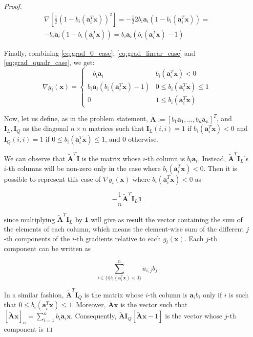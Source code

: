 \documentclass[12pt]{article}
\newcommand{\xb}{\mathbf{x}}
\newcommand{\ab}{\mathbf{a}}
\newcommand{\abi}{\ab_i}
\newcommand{\sumin}{\sum_{i = 1}^n}
\newcommand{\ax}{\abi^T\xb}
\newcommand{\atilde}{\mathbf{\tilde{A}}}
\newcommand{\id}{\mathbf{I}}
\newcommand{\ones}{\mathbf{1}}
\begin{document}
\begin{proof}
\begin{gather}
    \nabla \left [\frac{1}{2}(1 - b_i(\ax))^2\right] = \nonumber
    -\frac{1}{2} 2 b_i\abi(1 - b_i(\ax)) = \\ \label{eq:grad_quadr_case}
    -b_i\abi(1 - b_i(\ax)) = b_i\abi(b_i(\ax) - 1)
\end{gather}

Finally, combining \eqref{eq:grad_0_case}, \eqref{eq:grad_linear_case} and \eqref{eq:grad_quadr_case}, we get:
\begin{equation}
    \nabla g_i(\xb) = \begin{cases}
            -b_i\abi                & b_i(\ax) < 0 \\
            b_i\abi(b_i(\ax) - 1)   & 0 \leq b_i(\ax) \leq 1 \\
            0                       & 1 \le b_i(\ax)
    \end{cases}
\end{equation}

Now, let us define, as in the problem statement, $\atilde:=[b_1\ab_1, ..., b_n\ab_n]^T$, and $\id_L, \id_Q$ as the diagonal $n \times n$ matrices such that $\id_L(i,i) = 1$ if $b_i(\ax) < 0$ and $\id_Q(i,i) = 1$ if $0 \leq b_i(\ax) \leq 1$, and $0$ otherwise.

We can observe that $\atilde^T\id$ is the matrix whose $i$-th column is $b_i\abi$. Instead, $\atilde^T\id_L$'s $i$-th columns will be non-zero only in the case where $b_i(\ax) < 0$. Then it is possible to represent this case of $\nabla g_i(\xb)$ where $b_i(\ax) < 0$ as

\begin{equation} \label{eq:grad_matrix_linear_case}
    -\frac{1}{n}\atilde^T\id_L\ones
\end{equation}

since multiplying $\atilde^T\id_L$ by $\ones$ will give as result the vector containing the sum of the elements of each column, which means the element-wise sum of the different $j$-th components of the $i$-th gradients relative to each $g_i(\xb)$. Each $j$-th component can be written as

\begin{equation*}
    \sum_{i \in \{i | b_i(\ax) < 0\}}^{n} a_{i,j} b_j
\end{equation*}

In a similar fashion, $\atilde^T\id_Q$ is the matrix whose $i$-th column is $\abi b_i$ only if $i$ is such that $0 \leq b_i(\ax) \leq 1$. Moreover, $\atilde \xb$ is the vector such that $[\atilde \xb]_n = \sumin b_i\abi\xb$. Consequently, $\atilde\id_Q[\atilde \xb - 1]$ is the vector whose $j$-th component is


\end{proof}
\end{document}
